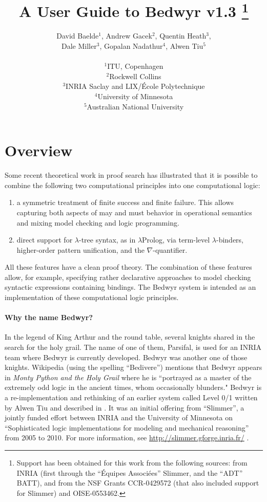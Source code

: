 \documentclass{article}
\title{{\Huge A User Guide to Bedwyr v1.3}
   \thanks{Support has been obtained for this work from the following
           sources: from INRIA (first through the ``\'Equipes
           Associ{\'e}es'' Slimmer, and the ``ADT'' BATT),
           and from the NSF Grants CCR-0429572 (that also included
           support for Slimmer) and OISE-0553462.}
}
\author{David Baelde$^1$, 
        Andrew Gacek$^2$, 
        Quentin Heath$^3$, \\  
        Dale Miller$^3$,
        Gopalan Nadathur$^4$, 
        Alwen Tiu$^5$ \\ \\
$^1$ITU, Copenhagen\\
$^2$Rockwell Collins\\
$^3$INRIA Saclay and LIX/\'Ecole Polytechnique\\
$^4$University of Minnesota\\
$^5$Australian National University
}
\newcommand{\lp}{$\lambda$Prolog}
\begin{document}
\maketitle
\tableofcontents
\newpage

\section{Overview}

Some recent theoretical work in proof search has illustrated that it
is possible to combine the following two computational principles into
one computational logic:
\begin{enumerate}
  \item a symmetric treatment of finite success and finite failure.
    This allows capturing both aspects of may and must behavior in
    operational semantics and mixing model checking and logic programming.

  \item direct support for $\lambda$-tree syntax, as in \lp{},
    via term-level $\lambda$-binders, higher-order pattern
    unification, and the $\nabla$-quantifier.
\end{enumerate}
All these features have a clean proof theory.  The combination of
these features allow, for example, specifying rather declarative
approaches to model checking syntactic expressions containing
bindings.  The Bedwyr system is intended as an implementation of these
computational logic principles.

\paragraph{Why the name Bedwyr?}
In the legend of King Arthur and the round table, several knights
shared in the search for the holy grail.  The name of one of them,
Parsifal, is used for an INRIA team where Bedwyr is currently
developed. Bedwyr was another one of those knights.  Wikipedia (using
the spelling ``Bedivere'') mentions that Bedwyr appears in {\em Monty
Python and the Holy Grail} where he is ``portrayed as a master of the
extremely odd logic in the ancient times, whom occasionally blunders."
Bedwyr is a re-implementation and rethinking of an earlier system
called Level 0/1 written by Alwen Tiu and described in
\cite{tiu05eshol}. It was an initial offering from ``Slimmer'', a
jointly funded effort between INRIA and the University of Minnesota on
``Sophisticated logic implementations for modeling and mechanical
reasoning'' from 2005 to 2010. For more information, see
\urldef{\thisurl}\url{http://slimmer.gforge.inria.fr/}
\ahrefurl{\thisurl}.
\end{document}

